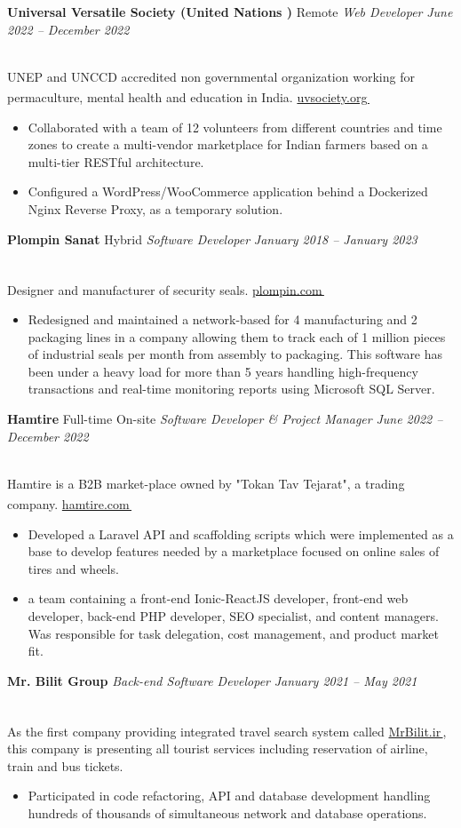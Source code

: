 \documentclass[11pt,a4paper]{article}
\makeatletter
\let\orighref\href
\renewcommand{\href}[2]{\orighref{#1}{#2\,{\textsuperscript{\tiny{\textcolor{heritagered}{\faExternalLink}}}}}}
\newcommand{\deemph}[1]{{\color{gray}#1}}
\newcommand{\info}[1]{
    \\
    \deemph{
        \faInfoCircle
        \hspace{0.15in}
         #1
     }
     \vspace{-7pt}
}
\newcommand{\resumeItem}[1]{
  \item\small{
    {#1 \vspace{-2pt}}
  }
}
\newcommand{\resumeSubheading}[4]{
  \vspace{-2pt}\item
      \textbf{#1} \small\deemph{#2}
      \textit{\small #3} \hfill \textit{\small\deemph{\textcolor{marineblue}{#4}}}
    \vspace{0pt}
}
\newcommand{\resumeItemListStart}{\begin{itemize}}
\newcommand{\resumeItemListEnd}{\end{itemize}\vspace{-5pt}}
\makeatother
\begin{document}
    \resumeSubheading
      {Universal Versatile Society (United Nations \highlight[qanary, draw=cream]{Volunteer})}{Remote}
      {Web Developer}{June 2022 -- December 2022}
      \info{UNEP and UNCCD accredited non governmental organization working for permaculture, mental health and education in India. \href{https://uvsociety.org}{uvsociety.org}}
      \resumeItemListStart
        \resumeItem{Collaborated with a team of 12 volunteers from different countries and time zones to create a multi-vendor marketplace for Indian farmers based on a multi-tier RESTful architecture.}
        \resumeItem{Configured a WordPress/WooCommerce application behind a Dockerized Nginx Reverse Proxy, as a temporary solution.}
      \resumeItemListEnd

    \resumeSubheading
      {Plompin Sanat}{Hybrid}
      {Software Developer}{January 2018 -- January 2023}
      \info{Designer and manufacturer of security seals. \href{http://en.plompin.com}{plompin.com}}
      \resumeItemListStart
        \resumeItem{Redesigned and maintained a network-based \highlight{desktop application} for 4 manufacturing and 2 packaging lines in a company allowing them to track each of 1 million pieces of industrial seals per month from assembly to packaging. This software has been under a heavy load for more than 5 years handling high-frequency transactions and real-time monitoring reports using Microsoft SQL Server.}
        \resumeItemListEnd

    \resumeSubheading
      {Hamtire}{Full-time On-site}
      {Software Developer \& Project Manager}{June 2022 -- December 2022}
      \info{Hamtire is a B2B market-place owned by "Tokan Tav Tejarat", a trading company. \href{https://hamtire.com}{hamtire.com}}
      \resumeItemListStart
        \resumeItem{Developed a Laravel API and scaffolding scripts which were implemented as a base to develop features needed by a marketplace focused on online sales of tires and wheels. }
        \resumeItem{ a team containing a front-end Ionic-ReactJS developer, front-end web developer, back-end PHP developer, SEO specialist, and content managers. Was responsible for task delegation, cost management, and product market fit.}
        \resumeItemListEnd

    \resumeSubheading
      {Mr. Bilit Group}{}
      {Back-end Software Developer}{January 2021 -- May 2021}
      \info{As the first company providing integrated travel search system called \href{MrBilit.ir}{MrBilit.ir}, this company is presenting all tourist services including reservation of airline, train and bus tickets.}
      \resumeItemListStart
        \resumeItem{Participated in code refactoring, API and database development handling hundreds of thousands of simultaneous network and database operations.}
        \resumeItemListEnd
        
\end{document}
